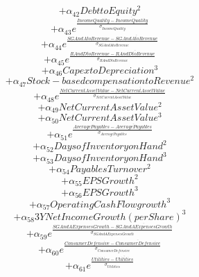 \[+\alpha_{42}Debt to Equity^2\]
\[+\alpha_{43}e^{\frac{Income Quality - \overline{Income Quality}}{\sigma_{Income Quality}}}\]
\[+\alpha_{44}e^{\frac{SGAndA to Revenue - \overline{SGAndA to Revenue}}{\sigma_{SGAndA to Revenue}}}\]
\[+\alpha_{45}e^{\frac{RAndD to Revenue - \overline{RAndD to Revenue}}{\sigma_{RAndD to Revenue}}}\]
\[+\alpha_{46}Capex to Depreciation^3\]
\[+\alpha_{47}Stock-based compensation to Revenue^2\]
\[+\alpha_{48}e^{\frac{Net Current Asset Value - \overline{Net Current Asset Value}}{\sigma_{Net Current Asset Value}}}\]
\[+\alpha_{49}Net Current Asset Value^2\]
\[+\alpha_{50}Net Current Asset Value^3\]
\[+\alpha_{51}e^{\frac{Average Payables - \overline{Average Payables}}{\sigma_{Average Payables}}}\]
\[+\alpha_{52}Days of Inventory on Hand^2\]
\[+\alpha_{53}Days of Inventory on Hand^3\]
\[+\alpha_{54}Payables Turnover^2\]
\[+\alpha_{55}EPS Growth^2\]
\[+\alpha_{56}EPS Growth^3\]
\[+\alpha_{57}Operating Cash Flow growth^3\]
\[+\alpha_{58}3Y Net Income Growth (per Share)^3\]
\[+\alpha_{59}e^{\frac{SGAndA Expenses Growth - \overline{SGAndA Expenses Growth}}{\sigma_{SGAndA Expenses Growth}}}\]
\[+\alpha_{60}e^{\frac{Consumer Defensive - \overline{Consumer Defensive}}{\sigma_{Consumer Defensive}}}\]
\[+\alpha_{61}e^{\frac{Utilities - \overline{Utilities}}{\sigma_{Utilities}}}\]
